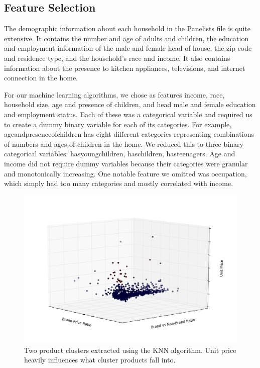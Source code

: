\documentclass[conference]{IEEEtran}
\begin{document}
\subsection{Feature Selection}

The demographic information about each household in the Panelists file is quite extensive. It contains the number and age of adults and children, the education and employment information of the male and female head of house, the zip code and residence type, and the household’s race and income. It also contains information about the presence to kitchen appliances, televisions, and internet connection in the home.
	
	
For our machine learning algorithms, we chose as features income, race, household size, age and presence of children, and head male and female education and employment status. Each of these was a categorical variable and required us to create a dummy binary variable for each of its categories. For example, age\textunderscore and\textunderscore presence\textunderscore of\textunderscore children has eight different categories representing combinations of numbers and ages of children in the home. We reduced this to three binary categorical variables: has\textunderscore young\textunderscore children, has\textunderscore children, has\textunderscore teenagers. Age and income did not require dummy variables because their categories were granular and monotonically increasing. One notable feature we omitted was occupation, which simply had too many categories and mostly correlated with income.

\begin{figure}
\centering
        \includegraphics[totalheight=6cm]{clusters}
    \caption{Two product clusters extracted  using the KNN algorithm. Unit price heavily influences what cluster products fall into.}
    \label{fig:verticalcell}
\end{figure}
\end{document}
